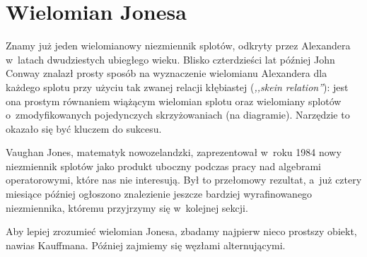 \section{Wielomian Jonesa} %
\label{sec:jones}

Znamy już jeden wielomianowy niezmiennik splotów, odkryty przez Alexandera w~latach dwudziestych ubiegłego wieku.
Blisko czterdzieści lat później John Conway znalazł prosty sposób na wyznaczenie wielomianu
Alexandera dla każdego splotu przy użyciu tak zwanej relacji kłębiastej (\emph{,,skein relation''}):
jest ona prostym równaniem wiążącym wielomian splotu oraz wielomiany
splotów o~zmodyfikowanych pojedynczych skrzyżowaniach (na diagramie).
Narzędzie to okazało się być kluczem do sukcesu.

Vaughan Jones, matematyk nowozelandzki, zaprezentował w~roku 1984 nowy niezmiennik splotów
jako produkt uboczny podczas pracy nad algebrami operatorowymi, które nas nie interesują.
Był to przełomowy rezultat, a~już cztery miesiące później ogłoszono znalezienie
jeszcze bardziej wyrafinowanego niezmiennika, któremu przyjrzymy się w~kolejnej sekcji.

Aby lepiej zrozumieć wielomian Jonesa, zbadamy najpierw nieco prostszy obiekt, nawias Kauffmana.
Później zajmiemy się węzłami alternującymi.













